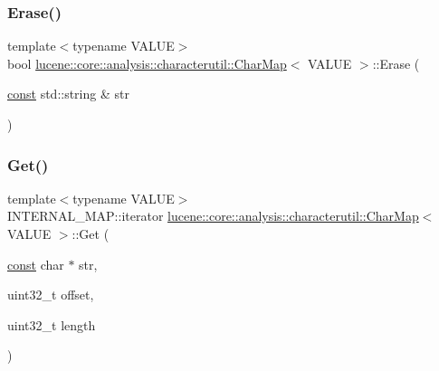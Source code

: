 \mbox{\label{classlucene_1_1core_1_1analysis_1_1characterutil_1_1CharMap_aa6267a07cdbe6c0d52c02ddad71c52ab}} 
\subsubsection{\texorpdfstring{Erase()}{Erase()}}
{\footnotesize\ttfamily template$<$typename V\+A\+L\+UE$>$ \\
bool \mbox{\hyperlink{classlucene_1_1core_1_1analysis_1_1characterutil_1_1CharMap}{lucene\+::core\+::analysis\+::characterutil\+::\+Char\+Map}}$<$ V\+A\+L\+UE $>$\+::Erase (\begin{DoxyParamCaption}\item[{\mbox{\hyperlink{ZlibCrc32_8h_a2c212835823e3c54a8ab6d95c652660e}{const}} std\+::string \&}]{str }\end{DoxyParamCaption})\hspace{0.3cm}{\ttfamily [inline]}}

\mbox{\label{classlucene_1_1core_1_1analysis_1_1characterutil_1_1CharMap_a48f8b551ec74f77bfbf6e53649d7ce74}} 
\subsubsection{\texorpdfstring{Get()}{Get()}\hspace{0.1cm}{\footnotesize\ttfamily [1/2]}}
{\footnotesize\ttfamily template$<$typename V\+A\+L\+UE$>$ \\
I\+N\+T\+E\+R\+N\+A\+L\+\_\+\+M\+A\+P\+::iterator \mbox{\hyperlink{classlucene_1_1core_1_1analysis_1_1characterutil_1_1CharMap}{lucene\+::core\+::analysis\+::characterutil\+::\+Char\+Map}}$<$ V\+A\+L\+UE $>$\+::Get (\begin{DoxyParamCaption}\item[{\mbox{\hyperlink{ZlibCrc32_8h_a2c212835823e3c54a8ab6d95c652660e}{const}} char $\ast$}]{str,  }\item[{uint32\+\_\+t}]{offset,  }\item[{uint32\+\_\+t}]{length }\end{DoxyParamCaption})\hspace{0.3cm}{\ttfamily [inline]}}

